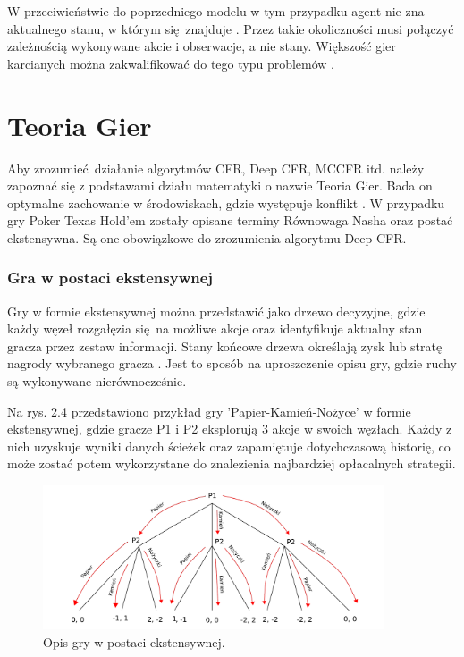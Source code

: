 \documentclass[12pt,oneside,a4paper]{report}
\begin{document}
W przeciwieństwie do poprzedniego modelu w tym przypadku agent nie zna aktualnego stanu, w którym
się znajduje \cite{mdp}. Przez takie okoliczności musi połączyć zależnością wykonywane akcie i
obserwacje, a nie stany. Większość gier karcianych można zakwalifikować do tego typu problemów
\cite{mdp}.

\section{Teoria Gier}

Aby zrozumieć działanie algorytmów CFR, Deep CFR, MCCFR itd. należy zapoznać się
z podstawami działu matematyki o nazwie Teoria Gier. Bada on optymalne zachowanie w środowiskach, gdzie
występuje konflikt \cite{rn}. W przypadku gry Poker Texas
Hold'em zostały opisane terminy Równowaga Nasha oraz
postać ekstensywna. Są one obowiązkowe do zrozumienia algorytmu Deep CFR.

\subsubsection{Gra w postaci ekstensywnej}

Gry w
formie ekstensywnej można przedstawić jako drzewo decyzyjne, gdzie każdy węzeł rozgałęzia się na
możliwe akcje oraz identyfikuje aktualny stan gracza przez zestaw informacji.
Stany końcowe drzewa określają zysk lub stratę nagrody wybranego gracza \cite{DCFR}.
Jest to sposób
na uproszczenie opisu gry, gdzie ruchy są wykonywane nierównocześnie.

Na rys. 2.4 przedstawiono przykład gry 'Papier-Kamień-Nożyce' w formie ekstensywnej, gdzie gracze P1 i
P2 eksplorują 3 akcje w swoich węzłach. 
Każdy z nich uzyskuje wyniki danych ścieżek oraz zapamiętuje dotychczasową historię, co może zostać potem
wykorzystane do znalezienia najbardziej opłacalnych strategii.

\begin{figure}[th!]
            \center
           \includegraphics[width=0.9\textwidth]{./img/drawing1.pdf}
           \caption{Opis gry w postaci ekstensywnej.}
\end{figure}
\end{document}
